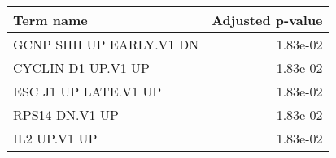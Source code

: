 \begin{tabular}{lr}
\toprule
              Term name &  Adjusted p-value \\
\midrule
GCNP SHH UP EARLY.V1 DN &          1.83e-02 \\
     CYCLIN D1 UP.V1 UP &          1.83e-02 \\
   ESC J1 UP LATE.V1 UP &          1.83e-02 \\
         RPS14 DN.V1 UP &          1.83e-02 \\
           IL2 UP.V1 UP &          1.83e-02 \\
\bottomrule
\end{tabular}
